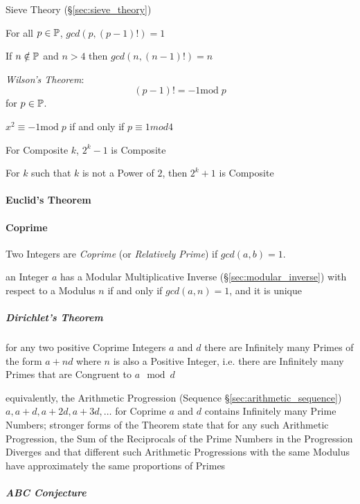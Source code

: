 Sieve Theory (\S\ref{sec:sieve_theory})

For all $p \in \mathbb{P}$, $gcd(p, (p-1)!) = 1$

If $n \notin \mathbb{P}$ and $n > 4$ then $gcd(n,(n-1)!) = n$

\emph{Wilson's Theorem}:
\[
  (p - 1)! = -1 \mathrm{mod}\;p
\]
for $p \in \mathbb{P}$.

$x^2 \equiv -1 \mathrm{mod}\;p$ if and only if $p \equiv 1 mod 4$

For Composite $k$, $2^k-1$ is Composite

For $k$ such that $k$ is not a Power of $2$, then $2^k+1$ is Composite



\paragraph{Euclid's Theorem}\label{sec:euclids_theorem}\hfill

\paragraph{Coprime}\label{sec:coprime}\hfill

Two Integers are \emph{Coprime} (or \emph{Relatively Prime}) if $gcd (a,b) = 1$.

\fist an Integer $a$ has a Modular Multiplicative Inverse
(\S\ref{sec:modular_inverse}) with respect to a Modulus $n$ if and only if
$gcd (a, n) = 1$, and it is unique



\subparagraph{Dirichlet's Theorem}\label{sec:dirichlets_theorem}\hfill

for any two positive Coprime Integers $a$ and $d$ there are Infinitely many
Primes of the form $a + nd$ where $n$ is also a Positive Integer, i.e. there are
Infinitely many Primes that are Congruent to $a \mod d$

equivalently, the Arithmetic Progression (Sequence
\S\ref{sec:arithmetic_sequence}) $a, a + d, a + 2d, a + 3d, \ldots$ for Coprime
$a$ and $d$ contains Infinitely many Prime Numbers; stronger forms of the
Theorem state that for any such Arithmetic Progression, the Sum of the
Reciprocals of the Prime Numbers in the Progression Diverges and that different
such Arithmetic Progressions with the same Modulus have approximately the same
proportions of Primes



\subparagraph{ABC Conjecture}\label{sec:abc_conjecture}\hfill

